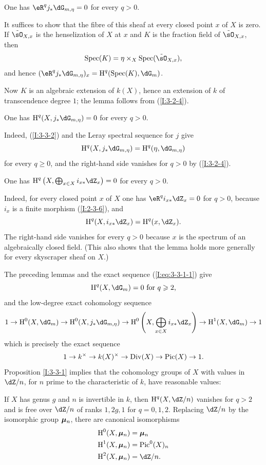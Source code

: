\begin{lemma}\label{I:3-3-2}
One has $\eR^qj_*\dG_{m,\eta}=0$ for every $q>0$.
\end{lemma}

It suffices to show that the fibre of this sheaf at every closed point
$x$ of $X$ is zero. If $\tilde\sO_{X,x}$ is the henselization of $X$ at
$x$ and $K$ is the fraction field of $\tilde\sO_{X,x}$, then
\[
  \spec(K) = \eta\times_X \spec(\tilde\sO_{X,x})\text{,}
\]
and hence $(\eR^qj_*\dG_{m,\eta})_x=\h^q(\spec(K),\dG_m)$.

Now $K$ is an algebraic extension of $k(X)$, hence an extension of $k$
of transcendence degree $1$; the lemma follows from (\ref{I:3-2-4}).

\begin{lemma}\label{I:3-3-3}
One has $\h^q(X,j_*\dG_{m,\eta})=0$ for every $q>0$.
\end{lemma}

Indeed, (\ref{I:3-3-2}) and the Leray spectral sequence for $j$ give
\[
  \h^q(X, j_* \dG_{m,\eta}) = \h^q(\eta,\dG_{m,\eta})
\]
for every $q\geqslant0$, and the right-hand side vanishes for $q>0$ by
(\ref{I:3-2-4}).

\begin{lemma}\label{I:3-3-4}
One has
$\h^q\left(X,\bigoplus_{x\in X}i_{x*}\dZ_x\right)=0$ for every $q>0$.
\end{lemma}

Indeed, for every closed point $x$ of $X$ one has
$\eR^qi_{x*}\dZ_x=0$ for $q>0$, because $i_x$ is a finite morphism
(\ref{I:2-3-6}), and
\[
  \h^q(X,i_{x*}\dZ_x) = \h^q(x,\dZ_x)\text{.}
\]
The right-hand side vanishes for every $q>0$ because $x$ is the spectrum
of an algebraically closed field. (This also shows that the lemma holds
more generally for every skyscraper sheaf on $X$.)

The preceding lemmas and the exact sequence (\ref{I:eq:3-3-1-1}) give
\[
  \h^q(X,\dG_m) = 0 \text{ for $q\geqslant 2$,}
\]
and the low-degree exact cohomology sequence
\[
  1 \to \h^0(X,\dG_m) \to \h^0(X, j_*\dG_{m,\eta}) \to \h^0\left(X,\bigoplus_{x\in X} i_{x*}\dZ_x\right) \to \h^1(X,\dG_m) \to 1
\]
which is precisely the exact sequence
\[
  1 \to k^\times \to k(X)^\times\to \operatorname{Div}(X) \to \operatorname{Pic}(X) \to 1\text{.}
\]
Proposition \ref{I:3-3-1} implies that the cohomology groups of $X$ with
values in $\dZ/n$, for $n$ prime to the characteristic of $k$, have
reasonable values:

\begin{corollary}\label{I:3-3-5}
If $X$ has genus $g$ and $n$ is invertible in $k$, then
$\h^q(X,\dZ/n)$ vanishes for $q>2$ and is free over $\dZ/n$ of ranks
$1,2g,1$ for $q=0,1,2$. Replacing $\dZ/n$ by the isomorphic group
${\bm\mu}_n$, there are canonical isomorphisms
\begin{align*}
  \h^0(X,\dmu_n) &= \dmu_n \\
  \h^1(X,\dmu_n) &= \pic^0(X)_n \\
  \h^2(X,\dmu_n) &= \dZ/n \text{.}
\end{align*}
\end{corollary}

